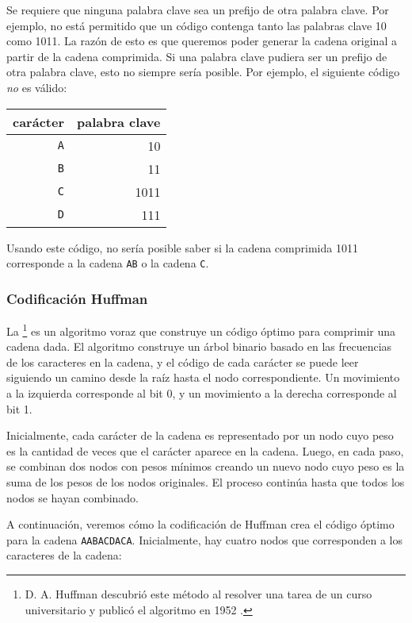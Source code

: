 Se requiere que ninguna palabra clave
sea un prefijo de otra palabra clave.
Por ejemplo, no está permitido que un código
contenga tanto las palabras clave 10
como 1011.
La razón de esto es que queremos
poder generar la cadena original
a partir de la cadena comprimida.
Si una palabra clave pudiera ser un prefijo de otra palabra clave,
esto no siempre sería posible.
Por ejemplo, el siguiente código \emph{no} es válido:
\begin{center}
  \begin{tabular}{rr}
    carácter   & palabra clave \\
    \hline
    \texttt{A} & 10            \\
    \texttt{B} & 11            \\
    \texttt{C} & 1011          \\
    \texttt{D} & 111           \\
  \end{tabular}
\end{center}
Usando este código, no sería posible saber
si la cadena comprimida 1011 corresponde a
la cadena \texttt{AB} o la cadena \texttt{C}.


\subsubsection{Codificación Huffman}

La \footnote{D. A. Huffman descubrió este método
  al resolver una tarea de un curso universitario
  y publicó el algoritmo en 1952 \cite{huf52}.} es un algoritmo voraz
que construye un código óptimo para
comprimir una cadena dada.
El algoritmo construye un árbol binario
basado en las frecuencias de los caracteres
en la cadena,
y el código de cada carácter se puede leer
siguiendo un camino desde la raíz hasta
el nodo correspondiente.
Un movimiento a la izquierda corresponde al bit 0,
y un movimiento a la derecha corresponde al bit 1.

Inicialmente, cada carácter de la cadena es
representado por un nodo cuyo peso es la
cantidad de veces que el carácter aparece en la cadena.
Luego, en cada paso, se combinan dos nodos con pesos mínimos
creando un nuevo nodo cuyo peso es la suma de los pesos
de los nodos originales.
El proceso continúa hasta que todos los nodos se hayan combinado.

A continuación, veremos cómo la codificación de Huffman crea
el código óptimo para la cadena
\texttt{AABACDACA}.
Inicialmente, hay cuatro nodos que corresponden
a los caracteres de la cadena:

